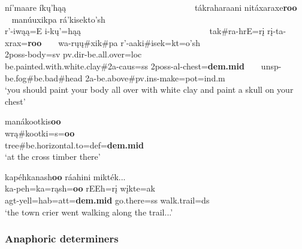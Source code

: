 \begin{exe}
\begin{xlist}
\item\label{ExamplesOfDeicticDeterminers5} \glll ní'maare íkų'hąą ~ ~ ~ ~ ~ ~ ~ ~ ~ ~ ~ ~ ~ ~ ~ ~ ~ ~ tákraharaani nitáxaraxe\textbf{roo} ~ ~ manúuxikpa {r}á'kisekto'sh\\
	r'-iwąą=E i-kų'=hąą ~ ~ ~ ~ ~ ~ ~ ~ ~ ~ ~ ~ ~ ~ ~ ~ ~ ~ tak\#ra-hrE=rį rį-ta-xrax=\textbf{roo} ~ ~  wa-rųų\#xik\#pa {r'}-aaki\#isek=kt=o'sh\\
	2poss-\textnormal{body}=sv pv.dir-\textnormal{be.all.over}=loc ~ ~ ~ ~ ~ ~ ~ ~ ~ ~ ~ ~ ~ ~ ~ ~ ~ ~  \textnormal{be.painted.with.white.clay}\#2a-caus=ss 2poss-al-\textnormal{chest}=\textbf{dem.mid} ~ ~ unsp-\textnormal{be.fog}\#\textnormal{be.bad}\#\textnormal{head} {2a}-\textnormal{be.above}\#pv.ins-\textnormal{make}=pot=ind.m\\
	\glt `you should paint your body all over with white clay and paint a skull on your chest' \citep[98]{hollow1973b}

\item\label{ExamplesOfDeicticDeterminers6} \glll manákootkis\textbf{oo}\\
    wrą\#kootki=s=\textbf{oo}\\
    \textnormal{tree}\#\textnormal{be.horizontal.to}=def=\textbf{dem.mid}\\
    \glt `at the cross timber there' \citep[25]{kennard1936}
    
\item\label{ExamplesOfDeicticDeterminers7} \glll kapéhkanash\textbf{oo} ráahini mikték...\\
    ka-peh=ka=rąsh=\textbf{oo} rEEh=rį wįkte=ak\\
    agt-\textnormal{yell}=hab=att=\textbf{dem.mid} \textnormal{go.there}=ss \textnormal{walk.trail}=ds\\
    \glt `the town crier went walking along the trail...' \citep[31]{trechter2012}
    
    
    

\end{xlist}

\end{exe}

\subsubsection{Anaphoric determiners}\label{SubSubSecAnaphoricDeterminers}

